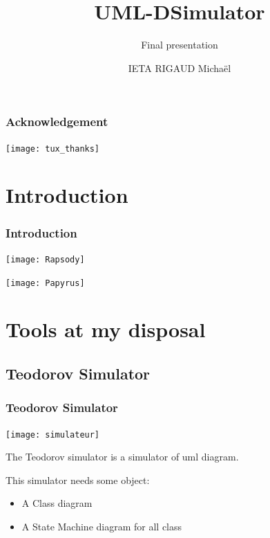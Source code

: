 \documentclass[10pt, svgnames, compress, red]{beamer}
\institute{ENSTA Bretagne}
\subtitle{Final presentation}
\title{UML-DSimulator}
\author{IETA RIGAUD Michaël}
\begin{document}
\begin{frame}
  \titlepage
  \transdissolve[duration=0.1]
\end{frame}

\begin{frame}
  \frametitle{Acknowledgement}
  \begin{center}
    \texttt{[image: tux\_thanks]}
  \end{center}
  \transdissolve[duration=0.1]
\end{frame}



\section{Introduction}
\begin{frame}
  \frametitle{Introduction}
  \begin{minipage}{0.45\linewidth}
    \texttt{[image: Rapsody]}
  \end{minipage}\hfill
  \begin{minipage}{0.45\linewidth}
    \texttt{[image: Papyrus]}
  \end{minipage}

  \transdissolve[duration=0.1]
\end{frame}

\section{Tools at my disposal}
\subsection{Teodorov Simulator}
\begin{frame}
  \frametitle{Teodorov Simulator}
  \begin{minipage}{0.45\textwidth}
    \texttt{[image: simulateur]}
  \end{minipage}\hfill
  \begin{minipage}{0.45\textwidth}
    The Teodorov simulator is a simulator of uml diagram.

    This simulator needs some object:
    \begin{itemize}
    \item A Class diagram
    \item A State Machine diagram for all class
    \end{itemize}
  \end{minipage}

  \transdissolve[duration=0.1]
\end{frame}
\end{document}
